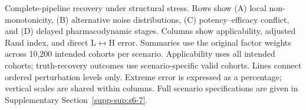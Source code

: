 Complete-pipeline recovery under structural stress. Rows show (A) local non-monotonicity, (B) alternative noise distributions, (C) potency--efficacy conflict, and (D) delayed pharmacodynamic stages. Columns show applicability, adjusted Rand index, and direct L\(\leftrightarrow\)H error. Summaries use the original factor weights across 10,200 intended cohorts per scenario. Applicability uses all intended cohorts; truth-recovery outcomes use scenario-specific valid cohorts. Lines connect ordered perturbation levels only. Extreme error is expressed as a percentage; vertical scales are shared within columns. Full scenario specifications are given in Supplementary Section~\ref{supp-sup:s6-7}.
